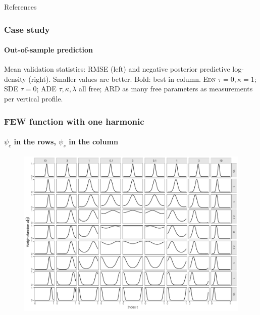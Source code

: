 \documentclass{snedecorbeamer}
\begin{document}

\begin{frame}[allowframebreaks]{References}
  \tiny
  
  
\end{frame}

\begin{frame}
  \frametitle{Case study}
  \framesubtitle{Out-of-sample prediction}

  \begin{table}
    \caption{Mean validation statistics
      $\bar{v}^{(p, q)}$: RMSE (left) and negPPLD (right).
      Smaller values are better. Bold: best in class.}%
    \label{tab:validation-statistics-mini}
  \end{table}

  Mean validation statistics: RMSE (left) and negative posterior
  predictive log-density (right).  Smaller values are better. Bold: best
  in column. \textsc{Edn} $\tau = 0, \kappa = 1$; \textsc{SDE} $\tau =
  0$; \textsc{ADE} $\tau, \kappa, \lambda$ all free; \textsc{ARD} as
  many free parameters as measurements per vertical profile.
\end{frame}

\begin{frame}
  \frametitle{FEW function with one harmonic}
  \framesubtitle{$\psi_{c}$ in the rows, $\psi_{s}$ in the column}

  \begin{figure}
    \centering
    \includegraphics[width=.65\textwidth]{FEW-G1-span}
  \end{figure}
\end{frame}
\end{document}
